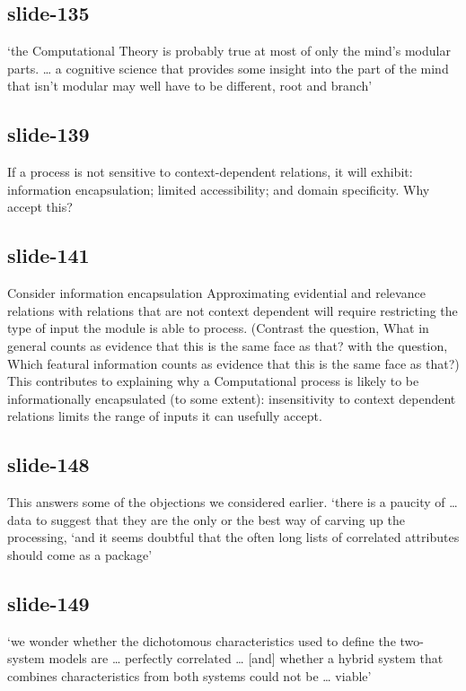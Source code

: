 \documentclass[12pt,\papersize]{extarticle}
\begin{document}
 
\subsection{slide-135}
‘the Computational Theory is probably true at most of only the mind’s modular parts. … a cognitive science that provides some insight into the part of the mind that isn’t modular may well have to be different, root and branch’
\citep[p.\ 99]{Fodor:2000cj}
 
 
\subsection{slide-139}
If a process is not sensitive to context-dependent relations, it will exhibit: information encapsulation; limited accessibility; and domain specificity.
\citep{Butterfill:2007pe}
Why accept this?
 
 
\subsection{slide-141}
Consider information encapsulation
Approximating evidential and relevance relations with relations that are not context dependent will require restricting the type of input the module is able to process. (Contrast the question, What in general counts as evidence that this is the same face as that? with the question, Which featural information counts as evidence that this is the same face as that?) This contributes to explaining why a Computational process is likely to be informationally encapsulated (to some extent): insensitivity to context dependent relations limits the range of inputs it can usefully accept.
 
 
\subsection{slide-148}
This answers some of the objections we considered earlier.
‘there is a paucity of … data to suggest that they are the only or the best way of carving up the processing,
‘and it seems doubtful that the often long lists of correlated attributes should come as a package’
\citep[p.\ 759]{adolphs_conceptual_2010}
 
 
\subsection{slide-149}
‘we wonder whether the dichotomous characteristics used to define the two-system models are … perfectly correlated …
[and] whether a hybrid system that combines characteristics from both systems could not be … viable’
\citep[p.\ 537]{keren_two_2009}
 
\end{document}
